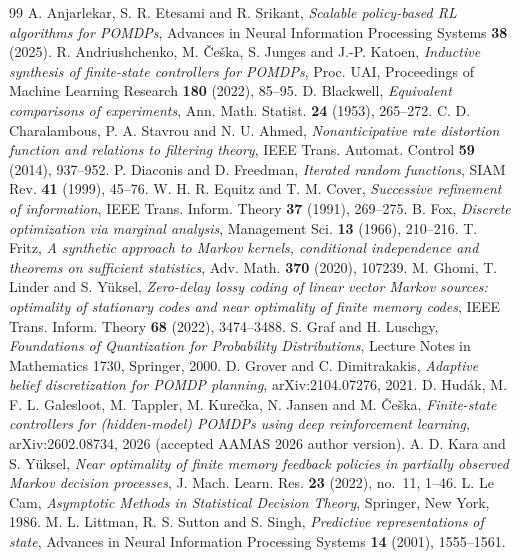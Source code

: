\begin{thebibliography}{99}
 A. Anjarlekar, S. R. Etesami and R. Srikant, \emph{Scalable policy-based RL algorithms for POMDPs}, Advances in Neural Information Processing Systems \textbf{38} (2025).
 R. Andriushchenko, M. \v{C}e\v{s}ka, S. Junges and J.-P. Katoen, \emph{Inductive synthesis of finite-state controllers for POMDPs}, Proc. UAI, Proceedings of Machine Learning Research \textbf{180} (2022), 85--95.
 D. Blackwell, \emph{Equivalent comparisons of experiments}, Ann. Math. Statist. \textbf{24} (1953), 265--272.
 C. D. Charalambous, P. A. Stavrou and N. U. Ahmed, \emph{Nonanticipative rate distortion function and relations to filtering theory}, IEEE Trans. Automat. Control \textbf{59} (2014), 937--952.
 P. Diaconis and D. Freedman, \emph{Iterated random functions}, SIAM Rev. \textbf{41} (1999), 45--76.
 W. H. R. Equitz and T. M. Cover, \emph{Successive refinement of information}, IEEE Trans. Inform. Theory \textbf{37} (1991), 269--275.
 B. Fox, \emph{Discrete optimization via marginal analysis}, Management Sci. \textbf{13} (1966), 210--216.
 T. Fritz, \emph{A synthetic approach to Markov kernels, conditional independence and theorems on sufficient statistics}, Adv. Math. \textbf{370} (2020), 107239.
 M. Ghomi, T. Linder and S. Y\"uksel, \emph{Zero-delay lossy coding of linear vector Markov sources: optimality of stationary codes and near optimality of finite memory codes}, IEEE Trans. Inform. Theory \textbf{68} (2022), 3474--3488.
 S. Graf and H. Luschgy, \emph{Foundations of Quantization for Probability Distributions}, Lecture Notes in Mathematics 1730, Springer, 2000.
 D. Grover and C. Dimitrakakis, \emph{Adaptive belief discretization for POMDP planning}, arXiv:2104.07276, 2021.
 D. Hud\'ak, M. F. L. Galesloot, M. Tappler, M. Kure\v{c}ka, N. Jansen and M. \v{C}e\v{s}ka, \emph{Finite-state controllers for (hidden-model) POMDPs using deep reinforcement learning}, arXiv:2602.08734, 2026 (accepted AAMAS 2026 author version).
 A. D. Kara and S. Y\"uksel, \emph{Near optimality of finite memory feedback policies in partially observed Markov decision processes}, J. Mach. Learn. Res. \textbf{23} (2022), no.~11, 1--46.
 L. Le Cam, \emph{Asymptotic Methods in Statistical Decision Theory}, Springer, New York, 1986.
 M. L. Littman, R. S. Sutton and S. Singh, \emph{Predictive representations of state}, Advances in Neural Information Processing Systems \textbf{14} (2001), 1555--1561.

\end{thebibliography}
